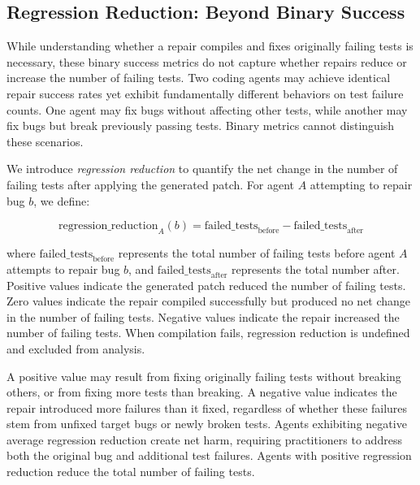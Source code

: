 \subsection{Regression Reduction: Beyond Binary Success}
\label{subsec:regression-reduction}

While understanding whether a repair compiles and fixes originally failing tests is necessary, these binary success metrics do not capture whether repairs reduce or increase the number of failing tests. Two coding agents may achieve identical repair success rates yet exhibit fundamentally different behaviors on test failure counts. One agent may fix bugs without affecting other tests, while another may fix bugs but break previously passing tests. Binary metrics cannot distinguish these scenarios.

We introduce \emph{regression reduction} to quantify the net change in the number of failing tests after applying the generated patch. For agent $A$ attempting to repair bug $b$, we define:

\[
\text{regression\_reduction}_A(b) = \text{failed\_tests}_{\text{before}} - \text{failed\_tests}_{\text{after}}
\]

where $\text{failed\_tests}_{\text{before}}$ represents the total number of failing tests before agent $A$ attempts to repair bug $b$, and $\text{failed\_tests}_{\text{after}}$ represents the total number after. Positive values indicate the generated patch reduced the number of failing tests. Zero values indicate the repair compiled successfully but produced no net change in the number of failing tests. Negative values indicate the repair increased the number of failing tests. When compilation fails, regression reduction is undefined and excluded from analysis.

A positive value may result from fixing originally failing tests without breaking others, or from fixing more tests than breaking. A negative value indicates the repair introduced more failures than it fixed, regardless of whether these failures stem from unfixed target bugs or newly broken tests. Agents exhibiting negative average regression reduction create net harm, requiring practitioners to address both the original bug and additional test failures. Agents with positive regression reduction reduce the total number of failing tests.